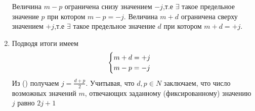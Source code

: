 \documentclass[__main__.tex]{subfiles}
\begin{document}
\begin{enumerate}
			Величина $m-p$ ограничена снизу значением $-j$,т.е $\exists$ такое предельное значение $p$ при котором $m-p = -j$. Величина $m+d$ ограничена сверху значением $+j$,т.е $\exists$ такое предельное значение $d$ при котором $m+d = +j$.
		\item Подводя итоги имеем
			\begin{equation}
				\llabel{k10-1}
				\begin{cases}
					m+d = +j\\
					m-p = -j
				\end{cases}
			\end{equation}	
			Из () получаем $j = \frac{d+p}{2}$. Учитывая, что $d,p \in N$ заключаем, что число возможных значений $m$, отвечающих заданному (фиксированному) значению $j$ равно $2j+1$
	\end{enumerate}
\end{document}
